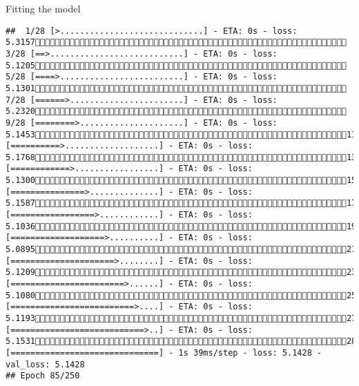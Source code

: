 \documentclass[
  ignorenonframetext,
]{beamer}
\begin{document}
\begin{frame}[fragile]{Fitting the model}
\begin{verbatim}
##  1/28 [>.............................] - ETA: 0s - loss: 5.3157 3/28 [==>...........................] - ETA: 0s - loss: 5.1205 5/28 [====>.........................] - ETA: 0s - loss: 5.1301 7/28 [======>.......................] - ETA: 0s - loss: 5.2320 9/28 [========>.....................] - ETA: 0s - loss: 5.145311/28 [==========>...................] - ETA: 0s - loss: 5.176813/28 [============>.................] - ETA: 0s - loss: 5.130015/28 [===============>..............] - ETA: 0s - loss: 5.158717/28 [=================>............] - ETA: 0s - loss: 5.103619/28 [===================>..........] - ETA: 0s - loss: 5.089521/28 [=====================>........] - ETA: 0s - loss: 5.120923/28 [=======================>......] - ETA: 0s - loss: 5.108025/28 [=========================>....] - ETA: 0s - loss: 5.119327/28 [===========================>..] - ETA: 0s - loss: 5.153128/28 [==============================] - 1s 39ms/step - loss: 5.1428 - val_loss: 5.1428
## Epoch 85/250

\end{verbatim}
\end{frame}
\end{document}
